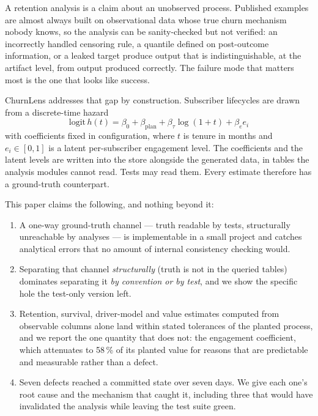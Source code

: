 \documentclass[conference]{IEEEtran}
\begin{document}
A retention analysis is a claim about an unobserved process. Published examples
are almost always built on observational data whose true churn mechanism nobody
knows, so the analysis can be sanity-checked but not verified: an incorrectly
handled censoring rule, a quantile defined on post-outcome information, or a
leaked target produce output that is indistinguishable, at the artifact level,
from output produced correctly. The failure mode that matters most is the one
that looks like success.

ChurnLens addresses that gap by construction. Subscriber lifecycles are drawn
from a discrete-time hazard
\begin{equation}
\mathrm{logit}\,h(t) = \beta_0 + \beta_{\mathrm{plan}} + \beta_\tau \log(1+t)
+ \beta_e e_i
\label{eq:hazard}
\end{equation}
with coefficients fixed in configuration, where $t$ is tenure in months and
$e_i \in [0,1]$ is a latent per-subscriber engagement level. The coefficients
and the latent levels are written into the store alongside the generated data,
in tables the analysis modules cannot read. Tests may read them. Every estimate
therefore has a ground-truth counterpart.

This paper claims the following, and nothing beyond it:

\begin{enumerate}
\item A one-way ground-truth channel --- truth readable by tests, structurally
unreachable by analyses --- is implementable in a small project and catches
analytical errors that no amount of internal consistency checking would.
\item Separating that channel \emph{structurally} (truth is not in the queried
tables) dominates separating it \emph{by convention or by test}, and we show
the specific hole the test-only version left.
\item Retention, survival, driver-model and value estimates computed from
observable columns alone land within stated tolerances of the planted process,
and we report the one quantity that does not: the engagement coefficient, which
attenuates to 58\,\% of its planted value for reasons that are predictable and
measurable rather than a defect.
\item Seven defects reached a committed state over seven days. We give each
one's root cause and the mechanism that caught it, including three that would
have invalidated the analysis while leaving the test suite green.
\end{enumerate}
\end{document}
